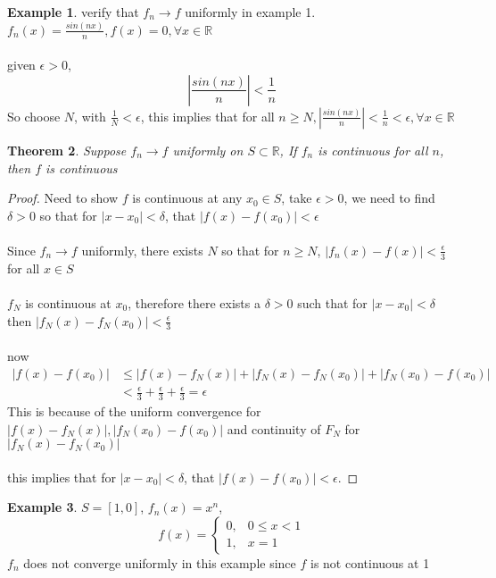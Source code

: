 \documentclass[12pt]{article}
\theoremstyle{plain}
\newtheorem{theorem}{Theorem}[section]
\theoremstyle{definition}
\newtheorem{example}[theorem]{Example}
\begin{document}
\begin{example}
	verify that $f_n \to f$ uniformly in example 1.\\
	$f_n (x) = \frac{sin(nx)}{n}, f(x) = 0, \forall x \in \mathbb{R}$\\
	\\
	given $\epsilon > 0$,
	$$|\frac{sin(nx)}{n}| < \frac{1}{n}$$
	So choose $N$, with $\frac{1}{N} < \epsilon$, this implies that for all $n \geq N, |\frac{sin(nx)}{n}| < \frac{1}{n} < \epsilon, \forall x \in \mathbb{R}$
\end{example}

\begin{theorem}
	Suppose $f_n \to f$ uniformly on $S \subset \mathbb{R}$, If $f_n$ is continuous for all $n$, then $f$ is continuous
\end{theorem}

\begin{proof}
	Need to show $f$ is continuous at any $x_0 \in S$, take $\epsilon > 0$, we need to find $\delta > 0$ so that for $|x - x_0| < \delta$, that $|f(x) - f(x_0)| < \epsilon$\\
	\\
	Since $f_n \to f$ uniformly, there exists $N$ so that for $n \geq N$, $|f_n (x) - f(x)| < \frac{\epsilon}{3}$ for all $x\in S$\\
	\\
	$f_N$ is continuous at $x_0$, therefore there exists a $\delta > 0$ such that for $|x-x_0| < \delta$ then $|f_N (x) - f_N (x_0)| < \frac{\epsilon}{3}$\\
	\\
	now
	\begin{align*}
		|f(x) - f(x_0)| & \leq |f(x) - f_N (x)| + |f_N (x) - f_N (x_0)| + |f_N (x_0) - f(x_0)|\\
		&< \frac{\epsilon}{3} + \frac{\epsilon}{3} + \frac{\epsilon}{3} = \epsilon
	\end{align*}
	This is because of the uniform convergence for $|f(x) - f_N (x)|, |f_N (x_0) - f(x_0)|$ and continuity of $F_N$ for $|f_N (x) - f_N (x_0)|$\\
	\\
	this implies that for $|x - x_0| < \delta$, that $|f(x) - f(x_0)| < \epsilon$.
\end{proof}

\begin{example}
	$S = [1,0]$, $f_n (x) = x^n$,
	$$f(x) = \begin{cases}
		0, &0 \leq x < 1\\
		1, &x = 1
	\end{cases}
$$
$f_n$ does not converge uniformly in this example since $f$ is not continuous at 1
\end{example}
\end{document}
